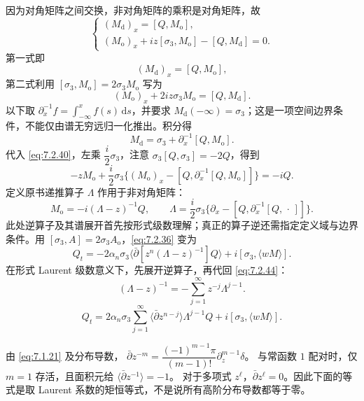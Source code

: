 \documentclass[lang=cn,scheme=chinese,mode=simple,device=normal,color=blue,math=cm,thmcnt=section,12pt]{elegantbook}
\newcommand{\dd}{\,\mathrm{d}}
\newcommand{\eqq}[2]{\tag{#1}\label{eq:#1}#2}
\begin{document}
因为对角矩阵之间交换，非对角矩阵的乘积是对角矩阵，故
\begin{equation}
\eqq{7.2.38}{\begin{cases}
(M_{\mathrm d})_x=[Q,M_{\mathrm o}],\\
(M_{\mathrm o})_x+iz[\sigma_3,M_{\mathrm o}]-[Q,M_{\mathrm d}]=0.
\end{cases}}
\end{equation}
第一式即
\begin{equation}
\eqq{7.2.39}{(M_{\mathrm d})_x=[Q,M_{\mathrm o}],}
\end{equation}
第二式利用 $[\sigma_3,M_{\mathrm o}]=2\sigma_3M_{\mathrm o}$ 写为
\begin{equation}
\eqq{7.2.40}{(M_{\mathrm o})_x+2iz\sigma_3M_{\mathrm o}=[Q,M_{\mathrm d}].}
\end{equation}
以下取 $\partial_x^{-1}f=\displaystyle\int_{-\infty}^x f(s)\dd s$，并要求 $M_{\mathrm d}(-\infty)=\sigma_3$；这是一项空间边界条件，不能仅由谱无穷远归一化推出。积分得
\begin{equation}
\eqq{7.2.41}{M_{\mathrm d}=\sigma_3+\partial_x^{-1}[Q,M_{\mathrm o}].}
\end{equation}
代入 \eqref{eq:7.2.40}，左乘 $\dfrac{i}{2}\sigma_3$，注意 $\sigma_3[Q,\sigma_3]=-2Q$，得到
\begin{equation}
\eqq{7.2.42}{-zM_{\mathrm o}+\dfrac{i}{2}\sigma_3\{(M_{\mathrm o})_x-[Q,\partial_x^{-1}[Q,M_{\mathrm o}]]\}=-iQ.}
\end{equation}
定义原书递推算子 $\Lambda$ 作用于非对角矩阵：
\begin{equation}
\eqq{7.2.43}{M_{\mathrm o}=-i(\Lambda-z)^{-1}Q,\qquad
\Lambda=\dfrac{i}{2}\sigma_3\{\partial_x-[Q,\partial_x^{-1}[Q,\,\cdot\,]]\}.}
\end{equation}
此处逆算子及其谱展开首先按形式级数理解；真正的算子逆还需指定定义域与边界条件。用 $[\sigma_3,A]=2\sigma_3A_{\mathrm o}$，\eqref{eq:7.2.36} 变为
\begin{equation}
\eqq{7.2.44}{Q_t=-2\alpha_n\sigma_3\langle\bar\partial[z^n(\Lambda-z)^{-1}]Q\rangle+i[\sigma_3,\langle wM\rangle].}
\end{equation}
在形式 Laurent 级数意义下，先展开逆算子，再代回 \eqref{eq:7.2.44}：
\[
(\Lambda-z)^{-1}=-\sum\limits_{j=1}^{\infty}z^{-j}\Lambda^{j-1}.
\]
\begin{equation}
\eqq{7.2.45}{Q_t=2\alpha_n\sigma_3\sum\limits_{j=1}^{\infty}\langle\bar\partial z^{n-j}\rangle\Lambda^{j-1}Q
+i[\sigma_3,\langle wM\rangle].}
\end{equation}
\begin{callout}[计算：谱矩只选出 $z^{-1}$ 项]
由 \eqref{eq:7.1.21} 及分布导数，
$\bar\partial z^{-m}=\dfrac{(-1)^{m-1}\pi}{(m-1)!}\partial_z^{m-1}\delta$。
与常函数 $1$ 配对时，仅 $m=1$ 存活，且面积元给
$\langle\bar\partial z^{-1}\rangle=-1$。
对于多项式 $z^\ell$，$\bar\partial z^\ell=0$。因此下面的等式是取 Laurent 系数的矩恒等式，不是说所有高阶分布导数都等于零。
\end{callout}
\end{document}
